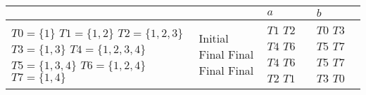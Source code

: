 \documentclass{standalone}
\begin{document}
\begin{tabularx}{\textwidth}{XXXX}
        &  & \(a\) & \(b\) \\
        \midrule
            \(T0 = \{1\}\) \newline
            \(T1 = \{1,2\}\) \newline
            \(T2 = \{1,2,3\}\) \newline
            \(T3 = \{1,3\}\) \newline
            \(T4 = \{1,2,3,4\}\) \newline
            \(T5 = \{1,3,4\}\) \newline
            \(T6 = \{1,2,4\}\) \newline
            \(T7 = \{1,4\}\)
            &
            Initial \newline
            \newline
            \newline
            \newline
            Final \newline
            Final \newline
            Final \newline
            Final
            &
            \(T1\) \newline
            \(T2\) \newline
            \(T4\) \newline
            \(T6\) \newline
            \(T4\) \newline
            \(T6\) \newline
            \(T2\) \newline
            \(T1\)
            &
            \(T0\) \newline
            \(T3\) \newline
            \(T5\) \newline
            \(T7\) \newline
            \(T5\) \newline
            \(T7\) \newline
            \(T3\) \newline
            \(T0\)
\end{tabularx}
\end{document}

